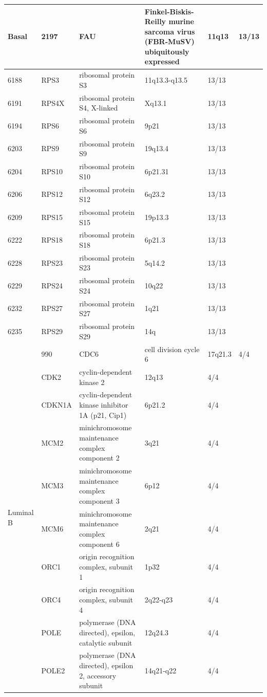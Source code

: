 \documentclass[11pt]{article}
\begin{document}
\begin{table}
{\begin{tabular}{|l|l|l|l|l|l|}
\hline
\multirow{13}{*}{Basal} & 2197 & FAU & Finkel-Biskis-Reilly murine sarcoma virus (FBR-MuSV) ubiquitously expressed & 11q13 & 13/13 \\
\hline
6188 & RPS3 & ribosomal protein S3 & 11q13.3-q13.5 & 13/13 \\
\hline
6191 & RPS4X & ribosomal protein S4, X-linked & Xq13.1 & 13/13 \\
\hline
6194 & RPS6 & ribosomal protein S6 & 9p21 & 13/13 \\
\hline
6203 & RPS9 & ribosomal protein S9 & 19q13.4 & 13/13 \\
\hline
6204 & RPS10 & ribosomal protein S10 & 6p21.31 & 13/13 \\
\hline
6206 & RPS12 & ribosomal protein S12 & 6q23.2 & 13/13 \\
\hline
6209 & RPS15 & ribosomal protein S15 & 19p13.3 & 13/13 \\
\hline
6222 & RPS18 & ribosomal protein S18 & 6p21.3 & 13/13 \\
\hline
6228 & RPS23 & ribosomal protein S23 & 5q14.2 & 13/13 \\
\hline
6229 & RPS24 & ribosomal protein S24 & 10q22 & 13/13 \\
\hline
6232 & RPS27 & ribosomal protein S27 & 1q21 & 13/13 \\
\hline
6235 & RPS29 & ribosomal protein S29 & 14q & 13/13 \\
\hline
\multirow{32}{*}{Luminal B} & 990 & CDC6 & cell division cycle 6 & 17q21.3 & 4/4 \\
\hline
1017 & CDK2 & cyclin-dependent kinase 2 & 12q13 & 4/4 \\
\hline
1026 & CDKN1A & cyclin-dependent kinase inhibitor 1A (p21, Cip1) & 6p21.2 & 4/4 \\
\hline
4171 & MCM2 & minichromosome maintenance complex component 2 & 3q21 & 4/4 \\
\hline
4172 & MCM3 & minichromosome maintenance complex component 3 & 6p12 & 4/4 \\
\hline
4175 & MCM6 & minichromosome maintenance complex component 6 & 2q21 & 4/4 \\
\hline
4998 & ORC1 & origin recognition complex, subunit 1 & 1p32 & 4/4 \\
\hline
5000 & ORC4 & origin recognition complex, subunit 4 & 2q22-q23 & 4/4 \\
\hline
5426 & POLE & polymerase (DNA directed), epsilon, catalytic subunit & 12q24.3 & 4/4 \\
\hline
5427 & POLE2 & polymerase (DNA directed), epsilon 2, accessory subunit & 14q21-q22 & 4/4 \\

\end{tabular}}
\end{table}
\end{document}
